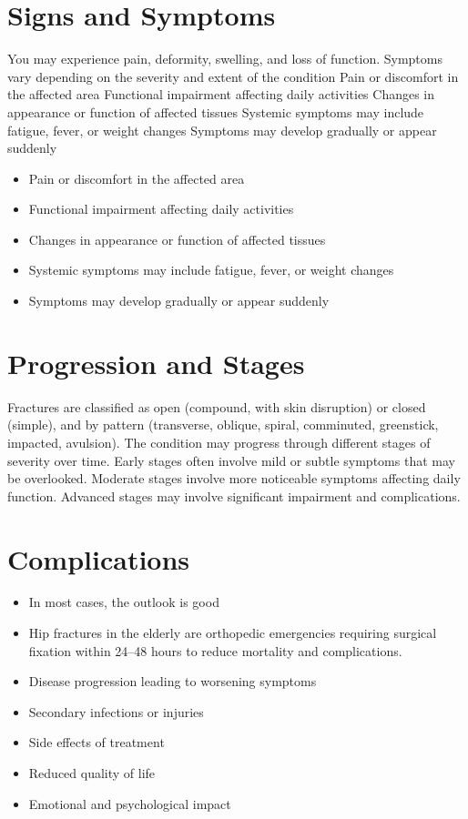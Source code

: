 \section{Signs and Symptoms}
You may experience pain, deformity, swelling, and loss of function. Symptoms vary depending on the severity and extent of the condition Pain or discomfort in the affected area Functional impairment affecting daily activities Changes in appearance or function of affected tissues Systemic symptoms may include fatigue, fever, or weight changes Symptoms may develop gradually or appear suddenly

\begin{itemize}[noitemsep]
  \item Pain or discomfort in the affected area
  \item Functional impairment affecting daily activities
  \item Changes in appearance or function of affected tissues
  \item Systemic symptoms may include fatigue, fever, or weight changes
  \item Symptoms may develop gradually or appear suddenly
\end{itemize}
\section{Progression and Stages}
Fractures are classified as open (compound, with skin disruption) or closed (simple), and by pattern (transverse, oblique, spiral, comminuted, greenstick, impacted, avulsion). The condition may progress through different stages of severity over time. Early stages often involve mild or subtle symptoms that may be overlooked. Moderate stages involve more noticeable symptoms affecting daily function. Advanced stages may involve significant impairment and complications.
\section{Complications}
\begin{itemize}[noitemsep]
  \item In most cases, the outlook is good
  \item Hip fractures in the elderly are orthopedic emergencies requiring surgical fixation within 24--48 hours to reduce mortality and complications.
  \item Disease progression leading to worsening symptoms
  \item Secondary infections or injuries
  \item Side effects of treatment
  \item Reduced quality of life
  \item Emotional and psychological impact
\end{itemize}
